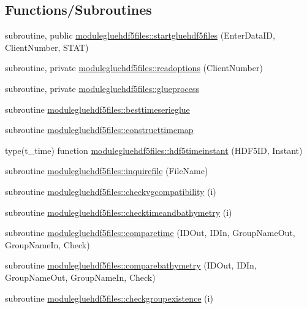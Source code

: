 \subsection*{Functions/\+Subroutines}
\begin{DoxyCompactItemize}
\item 
subroutine, public \mbox{\hyperlink{namespacemodulegluehdf5files_ab2346fccf5401da3d9edc023aaadba24}{modulegluehdf5files\+::startgluehdf5files}} (Enter\+Data\+ID, Client\+Number, S\+T\+AT)
\item 
subroutine, private \mbox{\hyperlink{namespacemodulegluehdf5files_ab3d0b7d8a5a6cb877abaa35b1f974842}{modulegluehdf5files\+::readoptions}} (Client\+Number)
\item 
subroutine, private \mbox{\hyperlink{namespacemodulegluehdf5files_acbfe773d67d0b68688bd5a0cf161456c}{modulegluehdf5files\+::glueprocess}}
\item 
subroutine \mbox{\hyperlink{namespacemodulegluehdf5files_a88e3c5be0d990bbff5725309d8c04656}{modulegluehdf5files\+::besttimeserieglue}}
\item 
subroutine \mbox{\hyperlink{namespacemodulegluehdf5files_a30ae163f5236c7c84af5e6fd552d3da1}{modulegluehdf5files\+::constructtimemap}}
\item 
type(t\+\_\+time) function \mbox{\hyperlink{namespacemodulegluehdf5files_a9a6c2b8f1c89f66fc3308854f2ab8e57}{modulegluehdf5files\+::hdf5timeinstant}} (H\+D\+F5\+ID, Instant)
\item 
subroutine \mbox{\hyperlink{namespacemodulegluehdf5files_a94366c8fe9f21f17f5e9be7a2738a5c1}{modulegluehdf5files\+::inquirefile}} (File\+Name)
\item 
subroutine \mbox{\hyperlink{namespacemodulegluehdf5files_ada0309bfc59c3d5ea77eb5355fff2964}{modulegluehdf5files\+::checkvgcompatibility}} (i)
\item 
subroutine \mbox{\hyperlink{namespacemodulegluehdf5files_a0770b2d20631e91c338f1f9a7db63c8a}{modulegluehdf5files\+::checktimeandbathymetry}} (i)
\item 
subroutine \mbox{\hyperlink{namespacemodulegluehdf5files_a133e090c390fb1c7e840d7fa26500914}{modulegluehdf5files\+::comparetime}} (I\+D\+Out, I\+D\+In, Group\+Name\+Out, Group\+Name\+In, Check)
\item 
subroutine \mbox{\hyperlink{namespacemodulegluehdf5files_affdb072b2fa667663ec2fcf107b11957}{modulegluehdf5files\+::comparebathymetry}} (I\+D\+Out, I\+D\+In, Group\+Name\+Out, Group\+Name\+In, Check)
\item 
subroutine \mbox{\hyperlink{namespacemodulegluehdf5files_a725536a9cfa2982b35ce20a2bd143ad8}{modulegluehdf5files\+::checkgroupexistence}} (i)

\end{DoxyCompactItemize}
